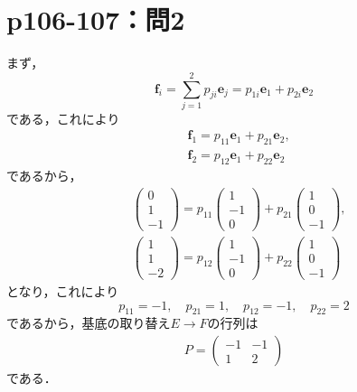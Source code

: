 \documentclass[a4paper,10pt,fleqn]{ltjsarticle}
\begin{document}
\newpage

\section*{p106-107：問2}

\begin{leftbar}
    まず，
    \begin{equation*}
        \bm{f}_i=\sum^{2}_{j=1}p_{ji}\bm{e}_{j}=p_{1i}\bm{e}_1+p_{2i}\bm{e}_2
    \end{equation*}
    である，これにより
    \begin{align*}
         & \bm{f}_1=p_{11}\bm{e}_1+p_{21}\bm{e}_2, \\
         & \bm{f}_2=p_{12}\bm{e}_1+p_{22}\bm{e}_2
    \end{align*}
    であるから，
    \begin{align*}
         &
        \begin{pmatrix}
            0 \\
            1 \\
            -1
        \end{pmatrix}
        =
        p_{11}
        \begin{pmatrix}
            1  \\
            -1 \\
            0
        \end{pmatrix}
        +p_{21}
        \begin{pmatrix}
            1 \\
            0 \\
            -1
        \end{pmatrix}
        ,  \\
         &
        \begin{pmatrix}
            1 \\
            1 \\
            -2
        \end{pmatrix}
        =
        p_{12}
        \begin{pmatrix}
            1  \\
            -1 \\
            0
        \end{pmatrix}
        +p_{22}
        \begin{pmatrix}
            1 \\
            0 \\
            -1
        \end{pmatrix}
    \end{align*}
    となり，これにより
    \[
        p_{11}=-1,\quad p_{21}=1,\quad p_{12}=-1,\quad p_{22}=2
    \]
    であるから，基底の取り替え$E \to F$の行列は
    \begin{align*}
        P=
        \begin{pmatrix}
            -1 & -1 \\
            1  & 2
        \end{pmatrix}
    \end{align*}
    である．
\end{leftbar}
\end{document}
